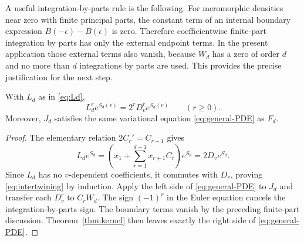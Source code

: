 A useful integration-by-parts rule is the following. For meromorphic densities near zero with finite principal parts, the constant term of an internal boundary expression $B(-\epsilon)-B(\epsilon)$ is zero. Therefore coefficientwise finite-part integration by parts has only the external endpoint terms. In the present application those external terms also vanish, because $W_d$ has a zero of order $d$ and no more than $d$ integrations by parts are used. This provides the precise justification for the next step.

\begin{lemma}\label{lem:intertwining}
With $L_d$ as in \eqref{eq:Ld},
\begin{equation}\label{eq:intertwining}
 L_d^r e^{S_d(v)}=2^rD_v^r e^{S_d(v)}\qquad(r\ge0).
\end{equation}
Moreover, $J_d$ satisfies the same variational equation \eqref{eq:general-PDE} as $F_d$.
\end{lemma}

\begin{proof}
The elementary relation $2C_r'=C_{r-1}$ gives
\[
 L_de^{S_d}=
 \left(x_1+\sum_{r=1}^{d-1}x_{r+1}C_r\right)e^{S_d}
 =2D_ve^{S_d}.
\]
Since $L_d$ has no $v$-dependent coefficients, it commutes with $D_v$, proving \eqref{eq:intertwining} by induction. Apply the left side of \eqref{eq:general-PDE} to $J_d$ and transfer each $D_v^r$ to $C_rW_d$. The sign $(-1)^r$ in the Euler equation cancels the integration-by-parts sign. The boundary terms vanish by the preceding finite-part discussion. Theorem~\ref{thm:kernel} then leaves exactly the right side of \eqref{eq:general-PDE}.
\end{proof}
